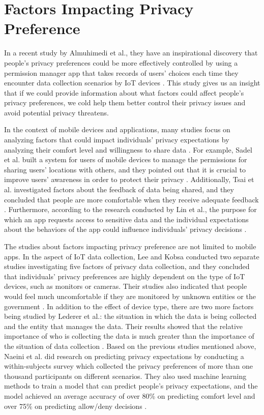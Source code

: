 \documentclass[msc,deptreport,ai]{infthesis}      %
\begin{document}
\section{Factors Impacting Privacy Preference}

In a recent study by Almuhimedi et al., they have an inspirational discovery that people's privacy preferences could be more effectively controlled by using a permission manager app that takes records of users' choices each time they encounter data collection scenarios by IoT devices \cite{Almuhimedi2015}. This study gives us an insight that if we could provide information about what factors could affect people's privacy preferences, we cold help them better control their privacy issues and avoid potential privacy threatens.

In the context of mobile devices and applications, many studies focus on analyzing factors that could impact individuals' privacy expectations by analyzing their comfort level and willingness to share data \cite{Sadeh2008UnderstandingAC, Tsai09whosviewed, Lin12expectationand}. For example, Sadel et al. built a system for users of mobile devices to manage the permissions for sharing users' locations with others, and they pointed out that it is crucial to improve users' awareness in order to protect their privacy \cite{Sadeh2008UnderstandingAC}. Additionally, Tsai et al. investigated factors about the feedback of data being shared, and they concluded that people are more comfortable when they receive adequate feedback \cite{Tsai09whosviewed}. Furthermore, according to the research conducted by Lin et al., the purpose for which an app requests access to sensitive data and the individual expectations about the behaviors of the app could influence individuals' privacy decisions \cite{Lin12expectationand}.

The studies about factors impacting privacy preference are not limited to mobile apps. In the aspect of IoT data collection, Lee and Kobsa conducted two separate studies investigating five factors of privacy data collection, and they concluded that individuals' privacy preferences are highly dependent on the type of IoT devices, such as monitors or cameras. Their studies also indicated that people would feel much uncomfortable if they are monitored by unknown entities or the government \cite{Lee2016UnderstandingUP, Lee2017PrivacyPM}. In addition to the effect of device type, there are two more factors being studied by Lederer et al.: the situation in which the data is being collected and the entity that manages the data. Their results showed that the relative importance of who is collecting the data is much greater than the importance of the situation of data collection \cite{Lederer03whowants}. Based on the previous studies mentioned above, Naeini et al. did research on predicting privacy expectations by conducting a within-subjects survey which collected the privacy preferences of more than one thousand participants on different scenarios. They also used machine learning methods to train a model that can predict people's privacy expectations, and the model achieved an average accuracy of over 80\% on predicting comfort level and over 75\% on predicting allow/deny decisions \cite{Naeini:2017}. 
\end{document}
